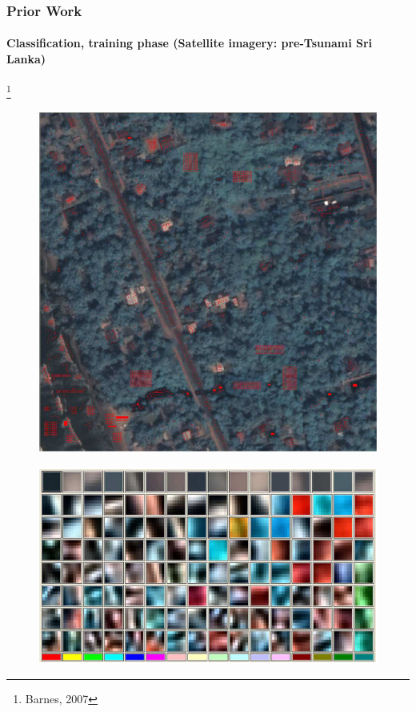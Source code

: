 \begin{frame}
\frametitle{Prior Work}
\framesubtitle{\small Classification, training phase (Satellite imagery: pre-Tsunami Sri Lanka)}
\mypagenum\footnote{Barnes, 2007}
	\begin{figure}		
		\includegraphics[height=0.30\textheight]{figs/RVQ_SatelliteSriLanka_1_snippets.png}			
	\end{figure}
	\begin{figure}		
		\includegraphics[height=0.30\textheight]{figs/RVQ_SatelliteSriLanka_2_codebooks.png}			
	\end{figure}
\end{frame}




